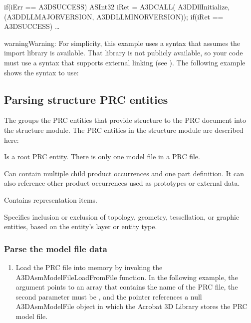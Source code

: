 \documentclass[letterpaper,12pt,english,openany,oneside]{sphinxmanual}
\begin{document}
\begin{sphinxVerbatim}[commandchars=\\\{\}]
if(iErr == A3D\PYGZus{}SUCCESS) \PYGZob{}
      ASInt32 iRet = A3DCALL(
          A3DDllInitialize,(A3D\PYGZus{}DLL\PYGZus{}MAJORVERSION, A3D\PYGZus{}DLL\PYGZus{}MINORVERSION));
      if(iRet == A3D\PYGZus{}SUCCESS) \PYGZob{} … \PYGZcb{}
\PYGZcb{}
\end{sphinxVerbatim}

\begin{sphinxadmonition}{warning}{Warning:}
For simplicity, this example uses a syntax that assumes the import library is available. That library is not publicly available, so your code must use a syntax that supports external linking (see ). The following example shows the syntax to use:
\end{sphinxadmonition}


\subsection{Parsing structure PRC entities}
\label{\detokenize{Plugins_A3D_API:parsing-structure-prc-entities}}
The  groups the PRC entities that provide structure to the PRC document into the structure module. The PRC entities in the structure module are described here:

 Is a root PRC entity. There is only one model file in a PRC file.

 Can contain multiple child product occurrences and one part definition. It can also reference other product occurrences used as prototypes or external data.

 Contains representation items.

 Specifies inclusion or exclusion of topology, geometry, tessellation, or graphic entities, based on the entity’s layer or entity type.


\subsubsection{Parse the model file data}
\label{\detokenize{Plugins_A3D_API:parse-the-model-file-data}}\begin{enumerate}
%
\item {} 
Load the PRC file into memory by invoking the A3DAsmModelFileLoadFromFile function. In the following example, the  argument points to an  array that contains the name of the PRC file, the second parameter must be , and the  pointer references a null A3DAsmModelFile object in which the Acrobat 3D Library stores the PRC model file.

\end{enumerate}
\end{document}
